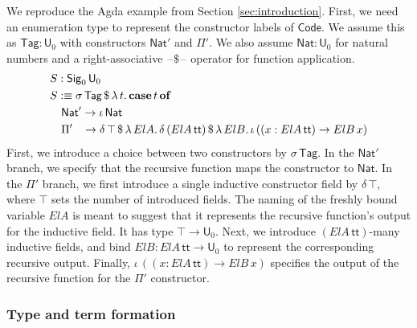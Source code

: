 \documentclass[acmsmall,screen,review]{acmart}
\newcommand{\msf}[1]{{\mathsf{#1}}}
\newcommand{\mbf}[1]{{\mathbf{#1}}}
\newcommand{\U}{\msf{U}}
\newcommand{\Nat}{\msf{Nat}}
\newcommand{\Sig}{\msf{Sig}}
\newcommand{\Code}{\msf{Code}}
\newcommand{\Tag}{\msf{Tag}}
\newcommand{\case}{\mbf{case}}
\newcommand{\of}{\mbf{of}}
\newcommand{\ttt}{\msf{tt}}
\newcommand{\blank}{{\mathord{\hspace{1pt}\text{--}\hspace{1pt}}}}
\begin{document}
\begin{example}\label{ex:code-signature}
We reproduce the Agda example from Section \ref{sec:introduction}. First, we need an enumeration
type to represent the constructor labels of $\Code$. We assume this as $\Tag : \U_0$ with
constructors $\Nat'$ and $\Pi'$. We also assume $\Nat : \U_0$ for natural numbers and a
right-associative $\blank\!\$\!\blank$ operator for function application.
\begin{alignat*}{4}
  & S : \Sig_0\,\U_0\\
  & S :\equiv \sigma\,\Tag\,\$\,\lambda\,t.\,\case\,t\,\of \\
  & \quad \Nat' \to \iota\,\Nat \\
  & \quad \Pi'\hspace{0.85em} \to \delta\,\top\,\$\,\lambda\,{ElA}.\, \delta\,({ElA}\,\ttt)\,\$\,\lambda\,{ElB}.\,
      \iota\, ((x : {ElA}\,\ttt) \to {ElB}\,x)
\end{alignat*}
First, we introduce a choice between two constructors by $\sigma\,\Tag$. In the $\Nat'$ branch, we
specify that the recursive function maps the constructor to $\Nat$. In the $\Pi'$ branch, we first
introduce a single inductive constructor field by $\delta\,\top$, where $\top$ sets the number of
introduced fields. The naming of the freshly bound variable ${ElA}$ is meant to suggest that it
represents the recursive function's output for the inductive field. It has type $\top \to \U_0$.
Next, we introduce $({ElA}\,\ttt)$-many inductive fields, and bind ${ElB} : {ElA}\,\ttt \to \U_0$ to
represent the corresponding recursive output. Finally, $\iota\, ((x : {ElA}\,\ttt) \to {ElB}\,x)$
specifies the output of the recursive function for the $\Pi'$ constructor.
\end{example}

\subsubsection{Type and term formation}\label{sec:ir-type-and-term-formation}
\end{document}
